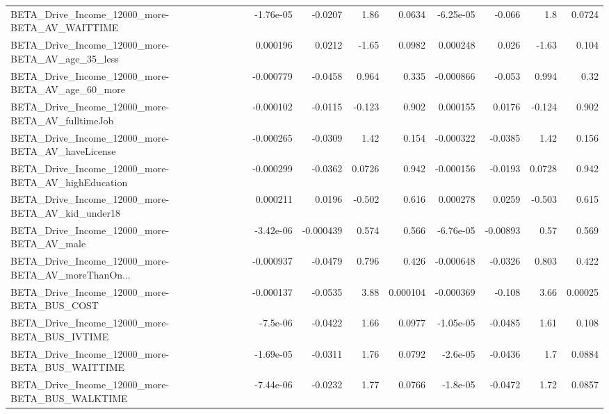 \begin{tabular}{lrrrrrrrr}
BETA\_Drive\_Income\_12000\_more-BETA\_AV\_WAITTIME      &   -1.76e-05 &      -0.0207 &     1.86 &   0.0634 &  -6.25e-05 &      -0.066 &          1.8 &        0.0724 \\
BETA\_Drive\_Income\_12000\_more-BETA\_AV\_age\_35\_less   &    0.000196 &       0.0212 &    -1.65 &   0.0982 &   0.000248 &       0.026 &        -1.63 &         0.104 \\
BETA\_Drive\_Income\_12000\_more-BETA\_AV\_age\_60\_more   &   -0.000779 &      -0.0458 &    0.964 &    0.335 &  -0.000866 &      -0.053 &        0.994 &          0.32 \\
BETA\_Drive\_Income\_12000\_more-BETA\_AV\_fulltimeJob   &   -0.000102 &      -0.0115 &   -0.123 &    0.902 &   0.000155 &      0.0176 &       -0.124 &         0.902 \\
BETA\_Drive\_Income\_12000\_more-BETA\_AV\_haveLicense   &   -0.000265 &      -0.0309 &     1.42 &    0.154 &  -0.000322 &     -0.0385 &         1.42 &         0.156 \\
BETA\_Drive\_Income\_12000\_more-BETA\_AV\_highEducation &   -0.000299 &      -0.0362 &   0.0726 &    0.942 &  -0.000156 &     -0.0193 &       0.0728 &         0.942 \\
BETA\_Drive\_Income\_12000\_more-BETA\_AV\_kid\_under18   &    0.000211 &       0.0196 &   -0.502 &    0.616 &   0.000278 &      0.0259 &       -0.503 &         0.615 \\
BETA\_Drive\_Income\_12000\_more-BETA\_AV\_male          &   -3.42e-06 &    -0.000439 &    0.574 &    0.566 &  -6.76e-05 &    -0.00893 &         0.57 &         0.569 \\
BETA\_Drive\_Income\_12000\_more-BETA\_AV\_moreThanOn... &   -0.000937 &      -0.0479 &    0.796 &    0.426 &  -0.000648 &     -0.0326 &        0.803 &         0.422 \\
BETA\_Drive\_Income\_12000\_more-BETA\_BUS\_COST         &   -0.000137 &      -0.0535 &     3.88 & 0.000104 &  -0.000369 &      -0.108 &         3.66 &       0.00025 \\
BETA\_Drive\_Income\_12000\_more-BETA\_BUS\_IVTIME       &    -7.5e-06 &      -0.0422 &     1.66 &   0.0977 &  -1.05e-05 &     -0.0485 &         1.61 &         0.108 \\
BETA\_Drive\_Income\_12000\_more-BETA\_BUS\_WAITTIME     &   -1.69e-05 &      -0.0311 &     1.76 &   0.0792 &   -2.6e-05 &     -0.0436 &          1.7 &        0.0884 \\
BETA\_Drive\_Income\_12000\_more-BETA\_BUS\_WALKTIME     &   -7.44e-06 &      -0.0232 &     1.77 &   0.0766 &   -1.8e-05 &     -0.0472 &         1.72 &        0.0857 \\

\end{tabular}
